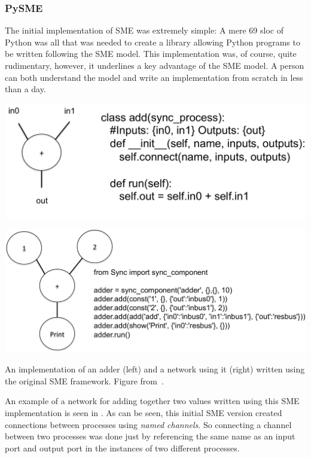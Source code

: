 \subsubsection{ PySME}
The initial implementation of SME was extremely simple: A mere 69 \gls{sloc} of
Python was all that was needed to create a library allowing Python programs to
be written following the SME model. This implementation was, of course, quite
rudimentary, however, it underlines a key advantage of the SME model. A person
can both understand the model and write an implementation from scratch in less
than a day.

\begin{widefigure}
  \centering
  \begin{minipage}{0.49\textwidth}
    \centering
    \includegraphics[width=.9\textwidth]{figures/add}
  \end{minipage}
  \begin{minipage}{0.49\textwidth}
    \centering
    \includegraphics[width=\textwidth]{figures/addnet}
  \end{minipage}
  \caption{An implementation of an adder (left) and a network using it (right)
    written using the original SME framework. Figure
    from~\cite{vinter2014synchronous}.}
  \label{fig:adder}
\end{widefigure}

An example of a network for adding together two values written using this SME
implementation is seen in . As can be seen, this initial SME
version created connections between processes using {\itshape named
  channels}. So connecting a channel between two processes was done just by
referencing the same name as an input port and output port in the instances of
two different processes.


